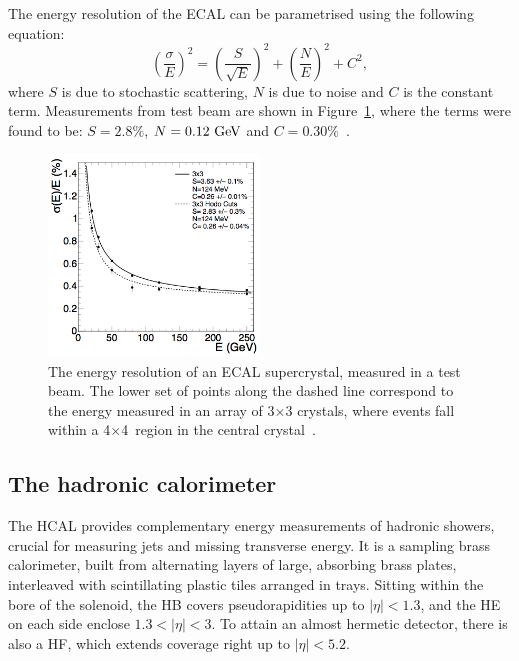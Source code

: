 The energy resolution of the \ac{ECAL} can be parametrised using the following equation:
\begin{equation}
\left(\frac{\sigma}{E}\right)^{2} = \left(\frac{S}{\sqrt{E}}\right)^{2} + \left(\frac{N}{E}\right)^{2} + C^{2},
\end{equation}
where $S$ is due to stochastic scattering, $N$ is due to noise and $C$ is the constant term. 
Measurements from test beam are shown in Figure~\ref{fig:CMSecalRes}, where the terms were found to be: $S = 2.8\%$, $N=0.12~\mathrm{GeV}$ and $C = 0.30\%$~\cite{Chatrchyan:2008zzk}. 

\begin{figure}
  \begin{center}
  \includegraphics[width=0.5\textwidth]{Figures/detector/EcalRes.png}
  \caption{The energy resolution of an \ac{ECAL} supercrystal, measured in a test beam. The lower set of points along the dashed line correspond to the energy measured in an array of 3$\times$3 crystals, where events fall within a 4$\times$4~\mm region in the central crystal~\cite{TDRVOL1}. 
}
  \label{fig:CMSecalRes}
  \end{center}
\end{figure}



\subsection{The hadronic calorimeter}
The \ac{HCAL} provides complementary energy measurements of hadronic showers, crucial for measuring jets and missing transverse energy.
It is a sampling brass calorimeter, built from alternating layers of large, absorbing brass plates, interleaved with scintillating plastic tiles arranged in trays. 
Sitting within the bore of the solenoid, the \ac{HB} covers pseudorapidities up to $|\eta|<1.3$,
and the \ac{HE} on each side enclose $1.3<|\eta|<3$.
To attain an almost hermetic detector, there is also a \ac{HF}, which extends coverage right up to $|\eta|<5.2$.

